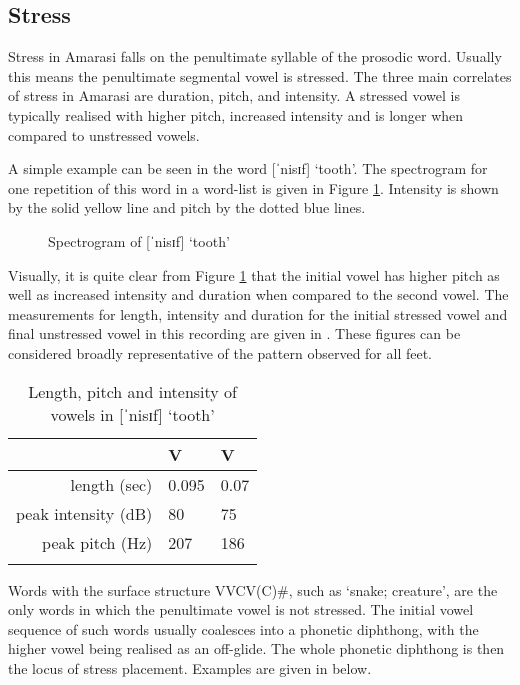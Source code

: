\subsection{Stress}\label{sec:Str}
Stress in Amarasi falls on the penultimate syllable of the prosodic word.
Usually this means the penultimate segmental vowel is stressed.
The three main correlates of stress in Amarasi are duration, pitch, and intensity.
A stressed vowel is typically realised with higher pitch,
increased intensity and is longer when compared to unstressed vowels.

A simple example can be seen in the word  {\ra} [ˈnisɪf] {} `tooth'.
The spectrogram for one repetition of this word in a word-list is given in Figure \ref{fig:SpeNis}.
Intensity is shown by the solid yellow line and pitch by the dotted blue lines.

\begin{figure}[h]
	\centering\setlength\fboxsep{-0.5pt}\setlength\fboxrule{0.75pt}
			\caption{Spectrogram of [ˈnisɪf] `tooth'}
	\label{fig:SpeNis}
\end{figure}

Visually, it is quite clear from Figure \ref{fig:SpeNis} that the initial vowel has higher pitch
as well as increased intensity and duration when compared to the second vowel.
The measurements for length, intensity and duration for the initial stressed vowel
and final unstressed vowel in this recording are given in .
These figures can be considered broadly representative of the pattern observed for all feet.

\begin{table}[h]
	\centering\caption{Length, pitch and intensity of vowels in [ˈnisɪf] `tooth'}\label{tab:LenPitIntVowNis}
		\begin{tabular}{rll} \lsptoprule
										& V\sub{1}& V\sub{2} \\ \midrule
			length (sec)	&   0.095	&   0.07 \\ 
			peak intensity (dB)&  80	&  75 \\ 
			peak pitch (Hz)		& 207	& 186 \\ \lspbottomrule
		\end{tabular}
\end{table}

Words with the surface structure VVCV(C){\#},
such as  `snake; creature',
are the only words in which the penultimate vowel is not stressed.
The initial vowel sequence of such words usually coalesces into a phonetic diphthong,
with the higher vowel being realised as an off-glide.
The whole phonetic diphthong is then the locus of stress placement.
Examples are given in  below.

